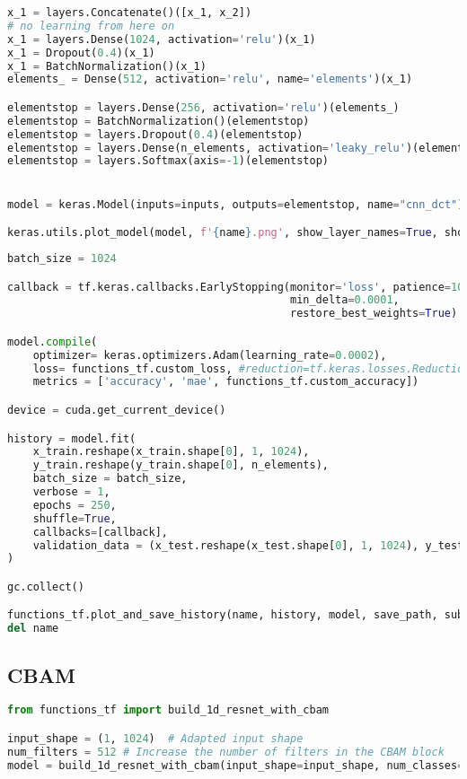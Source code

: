 \begin{lstlisting}[language=Python]
x_1 = layers.Concatenate()([x_1, x_2])
# no learning from here on
x_1 = layers.Dense(1024, activation='relu')(x_1)
x_1 = Dropout(0.4)(x_1)
x_1 = BatchNormalization()(x_1)
elements_ = Dense(512, activation='relu', name='elements')(x_1)

elementstop = layers.Dense(256, activation='relu')(elements_)
elementstop = BatchNormalization()(elementstop)
elementstop = layers.Dropout(0.4)(elementstop)
elementstop = layers.Dense(n_elements, activation='leaky_relu')(elementstop)
elementstop = layers.Softmax(axis=-1)(elementstop)


model = keras.Model(inputs=inputs, outputs=elementstop, name="cnn_dct")

keras.utils.plot_model(model, f'{name}.png', show_layer_names=True, show_layer_activations=True, show_shapes=True)
\end{lstlisting}

\begin{lstlisting}[language=Python]
batch_size = 1024

callback = tf.keras.callbacks.EarlyStopping(monitor='loss', patience=10,
                                            min_delta=0.0001,
                                            restore_best_weights=True)

model.compile(
    optimizer= keras.optimizers.Adam(learning_rate=0.0002),
    loss= functions_tf.custom_loss, #reduction=tf.keras.losses.Reduction.SUM
    metrics = ['accuracy', 'mae', functions_tf.custom_accuracy])

device = cuda.get_current_device()

history = model.fit(
    x_train.reshape(x_train.shape[0], 1, 1024),
    y_train.reshape(y_train.shape[0], n_elements),
    batch_size = batch_size,
    verbose = 1,
    epochs = 250,
    shuffle=True,
    callbacks=[callback],
    validation_data = (x_test.reshape(x_test.shape[0], 1, 1024), y_test.reshape(y_test.shape[0], n_elements))
)

gc.collect()

functions_tf.plot_and_save_history(name, history, model, save_path, subfolder='DCT', plot_acc=False)
del name
\end{lstlisting}

\hypertarget{cbam}{%
\subsection*{CBAM}\label{cbam}}

\begin{lstlisting}[language=Python]
from functions_tf import build_1d_resnet_with_cbam

input_shape = (1, 1024)  # Adapted input shape
num_filters = 512 # Increase the number of filters in the CBAM block
model = build_1d_resnet_with_cbam(input_shape=input_shape, num_classes=n_elements, num_filters=num_filters, res_block_num=3, output_shape=(1,n_elements))
\end{lstlisting}


